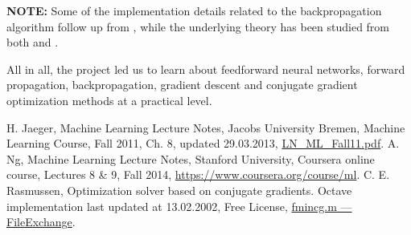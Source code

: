 \documentclass[a4paper,10pt]{article}
\begin{document}
\textbf{NOTE:} Some of the implementation details related to the backpropagation algorithm follow up from \cite{an}, while the underlying theory has been studied from both \cite{hj} and \cite{an}. 

All in all, the project led us to learn about feedforward neural networks, forward propagation, backpropagation, gradient descent and conjugate gradient optimization methods at a practical level.

\begin{thebibliography}{3}
 H. Jaeger, Machine Learning Lecture Notes, Jacobs University Bremen, Machine Learning Course, Fall 2011, Ch. 8, updated 29.03.2013, \href{http://minds.jacobs-university.de/sites/default/files/uploads/teaching/lectureNotes/LN_ML_Fall11.pdf}{LN\_ML\_Fall11.pdf}.
 A. Ng, Machine Learning Lecture Notes, Stanford University, Coursera online course,  Lectures 8 \& 9, Fall 2014, \href{https://www.coursera.org/course/ml}{https://www.coursera.org/course/ml}.
 C. E. Rasmussen, Optimization solver based on conjugate gradients. Octave implementation last updated at 13.02.2002, Free License, \href{http://www.mathworks.com/matlabcentral/fileexchange/42770-logistic-regression-with-regularization-used-to-classify-hand-written-digits/content/Logistic%20Regression%20with%20regularisation/fmincg.m}{fmincg.m --- FileExchange}.
\end{thebibliography}
\end{document}
